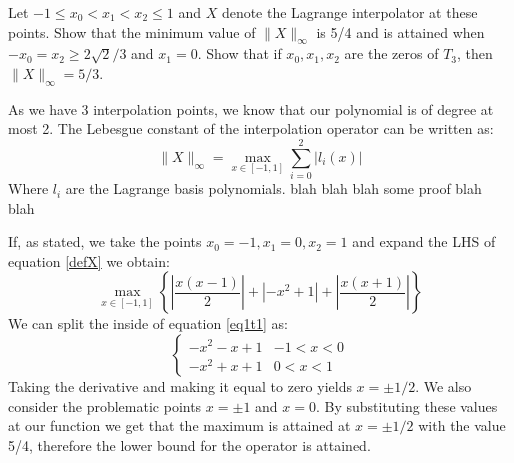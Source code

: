 \begin{problem}
Let $-1 \leq x_0 < x_1 < x_2 \leq 1$ and $X$ denote the Lagrange
interpolator at these points. Show that the minimum value of
$\lVert X \rVert_\infty$ is 5/4 and is attained when $-x_0 = x_2 \geq 2
\sqrt{2}/3$ and $x_1 = 0$. Show that if $x_0 , x_1 , x_2$ are
the zeros of $T_3$, then $\lVert X \rVert_\infty = 5/3$.
\end{problem}


\begin{solution}  
As we have 3 interpolation points, we know that our polynomial is of degree at most 2. The Lebesgue constant of the interpolation operator can be written as:
\begin{equation}
\lVert X \rVert_{\infty} = \max_{x\in [-1,1]} \sum_{i=0}^2 \lvert l_i(x) \rvert
\label{defX}
\end{equation}
Where $l_i$ are the Lagrange basis polynomials. blah blah blah some proof blah blah

If, as stated, we take the points $x_0 = -1, x_1 = 0, x_2 = 1$ and expand the LHS of equation \ref{defX} we obtain:
\begin{equation}
\max_{x \in [-1,1]} \left \{ \left | \frac{x(x-1)}{2} \right | + \left | -x^2+1 \right | + \left | \frac{x(x+1)}{2} \right | \right \}
\label{eq1t1}
\end{equation}
We can split the inside of equation \ref{eq1t1} as:
\[ \begin{cases} 
      -x^2-x+1  &-1< x< 0 \\
      -x^2+x+1  &0< x<1 
   \end{cases}
\]
Taking the derivative and making it equal to zero yields $x = \pm 1/2$. We also consider the problematic points $x = \pm 1$ and $x = 0$. By substituting these values at our function we get that the maximum is attained at $x=\pm 1/2$ with the value 5/4, therefore the lower bound for the operator is attained.


\end{solution}
